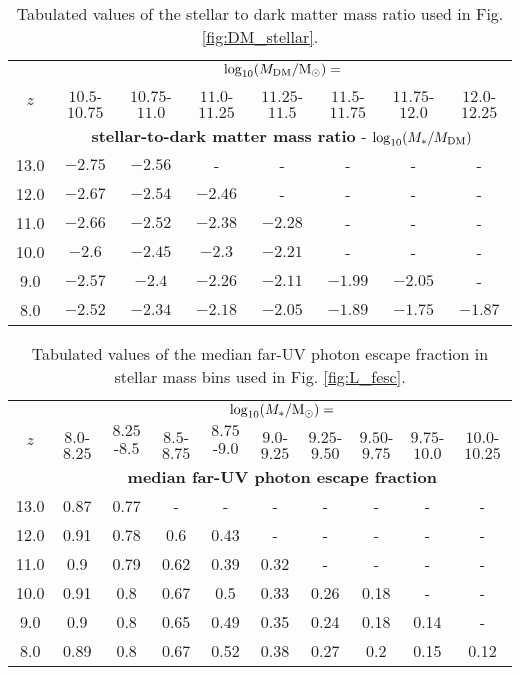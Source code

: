 

\begin{table*}
\caption{Tabulated values of the stellar to dark matter mass ratio used in Fig. \ref{fig:DM_stellar}.}
\label{tab:DM_stellar}
\begin{tabular}{cccccccc}
\hline
    & \multicolumn{7}{c}{$\log_{10}(M_{\rm DM}/{\rm M_{\odot}})=$} \\
$z$ & $10.5$-$10.75$ & $10.75$-$11.0$ & $11.0$-$11.25$ & $11.25$-$11.5$ & $11.5$-$11.75$ & $11.75$-$12.0$ & $12.0$-$12.25$ \\
\hline
    & \multicolumn{7}{c}{{\bf stellar-to-dark matter mass ratio} - $\log_{10}(M_*/M_{\rm DM})$} \\
\hline
 13.0 & $-2.75 $  & $-2.56 $  & - & - & - & - & -\\
 12.0 & $-2.67 $  & $-2.54 $  & $-2.46 $  & - & - & - & -\\
 11.0 & $-2.66 $  & $-2.52 $  & $-2.38 $  & $-2.28 $  & - & - & -\\
 10.0 & $-2.6 $  & $-2.45 $  & $-2.3 $  & $-2.21 $  & - & - & -\\
 9.0 & $-2.57 $  & $-2.4 $  & $-2.26 $  & $-2.11 $  & $-1.99 $  & $-2.05 $  & -\\
 8.0 & $-2.52 $  & $-2.34 $  & $-2.18 $  & $-2.05 $  & $-1.89 $  & $-1.75 $  & $-1.87 $ \\
\hline
\end{tabular}
\end{table*}




















\begin{table*}
\caption{Tabulated values of the median far-UV photon escape fraction in stellar mass bins used in Fig. \ref{fig:L_fesc}.}
\label{tab:L_fesc}
\begin{tabular}{cccccccccc}
\hline
    & \multicolumn{9}{c}{$\log_{10}(M_*/{\rm M_{\odot}})=$} \\
$z$ & $8.0$-$8.25$ & $8.25$-$8.5$ & $8.5$-$8.75$ & $8.75$-$9.0$ & $9.0$-$9.25$ & $9.25$-$9.50$ & $9.50$-$9.75$ & $9.75$-$10.0$ & $10.0$-$10.25$ \\
\hline
    & \multicolumn{9}{c}{{\bf median far-UV photon escape fraction}} \\
\hline
 13.0 & 0.87 & 0.77 & - & - & - & - & - & - & -\\
 12.0 & 0.91 & 0.78 & 0.6 & 0.43 & - & - & - & - & -\\
 11.0 & 0.9 & 0.79 & 0.62 & 0.39 & 0.32 & - & - & - & -\\
 10.0 & 0.91 & 0.8 & 0.67 & 0.5 & 0.33 & 0.26 & 0.18 & - & -\\
 9.0 & 0.9 & 0.8 & 0.65 & 0.49 & 0.35 & 0.24 & 0.18 & 0.14 & -\\
 8.0 & 0.89 & 0.8 & 0.67 & 0.52 & 0.38 & 0.27 & 0.2 & 0.15 & 0.12\\
\hline
\end{tabular}
\end{table*}

